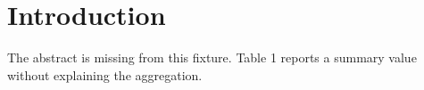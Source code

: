 \documentclass{article}
\begin{document}
\section{Introduction}
The abstract is missing from this fixture.
Table 1 reports a summary value without explaining the aggregation.
\end{document}
